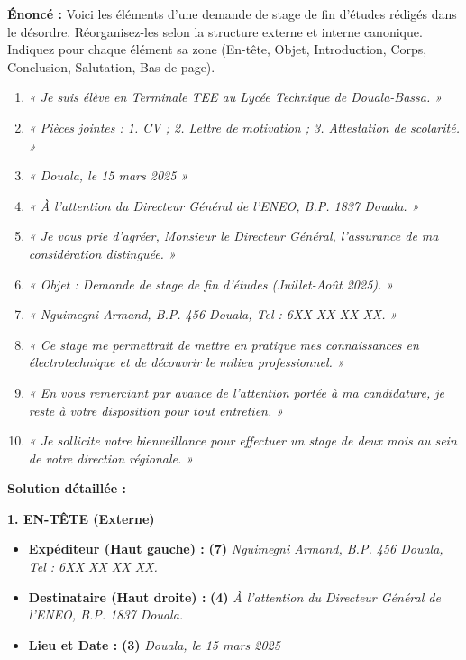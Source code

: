 \documentclass[11pt]{article}
\begin{document}
\begin{exoresolu}
\textbf{Énoncé :} Voici les éléments d'une demande de stage de fin d'études rédigés dans le désordre. Réorganisez-les selon la structure externe et interne canonique. Indiquez pour chaque élément sa zone (En-tête, Objet, Introduction, Corps, Conclusion, Salutation, Bas de page).

\begin{enumerate}
    \item \emph{« Je suis élève en Terminale TEE au Lycée Technique de Douala-Bassa. »}
    \item \emph{« Pièces jointes : 1. CV ; 2. Lettre de motivation ; 3. Attestation de scolarité. »}
    \item \emph{« Douala, le 15 mars 2025 »}
    \item \emph{« À l'attention du Directeur Général de l'ENEO, B.P. 1837 Douala. »}
    \item \emph{« Je vous prie d'agréer, Monsieur le Directeur Général, l'assurance de ma considération distinguée. »}
    \item \emph{« Objet : Demande de stage de fin d'études (Juillet-Août 2025). »}
    \item \emph{« Nguimegni Armand, B.P. 456 Douala, Tel : 6XX XX XX XX. »}
    \item \emph{« Ce stage me permettrait de mettre en pratique mes connaissances en électrotechnique et de découvrir le milieu professionnel. »}
    \item \emph{« En vous remerciant par avance de l'attention portée à ma candidature, je reste à votre disposition pour tout entretien. »}
    \item \emph{« Je sollicite votre bienveillance pour effectuer un stage de deux mois au sein de votre direction régionale. »}
\end{enumerate}

\tcblower
\textbf{Solution détaillée :}

\textbf{1. EN-TÊTE (Externe)}
\begin{itemize}
    \item \textbf{Expéditeur (Haut gauche) :} \textbf{(7)} \emph{Nguimegni Armand, B.P. 456 Douala, Tel : 6XX XX XX XX.}
    \item \textbf{Destinataire (Haut droite) :} \textbf{(4)} \emph{À l'attention du Directeur Général de l'ENEO, B.P. 1837 Douala.}
    \item \textbf{Lieu et Date :} \textbf{(3)} \emph{Douala, le 15 mars 2025}
\end{itemize}


\end{exoresolu}
\end{document}
